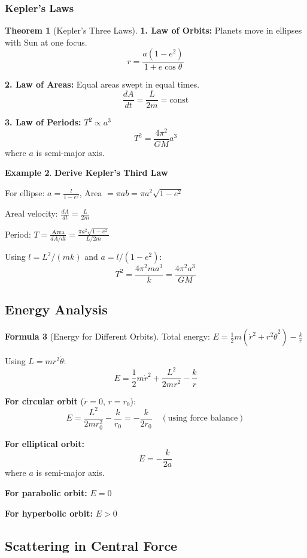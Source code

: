 \documentclass[12pt,a4paper]{article}
\theoremstyle{definition}
\newtheorem{theorem}{Theorem}[section]
\newtheorem{example}[theorem]{Example}
\newtheorem{formula}[theorem]{Formula}
\begin{document}
\subsubsection{Kepler's Laws}

\begin{theorem}[Kepler's Three Laws]
\textbf{1. Law of Orbits:} Planets move in ellipses with Sun at one focus.
\[
r = \frac{a(1-e^2)}{1 + e\cos\theta}
\]

\textbf{2. Law of Areas:} Equal areas swept in equal times.
\[
\frac{dA}{dt} = \frac{L}{2m} = \text{const}
\]

\textbf{3. Law of Periods:} $T^2 \propto a^3$
\[
T^2 = \frac{4\pi^2}{GM}a^3
\]
where $a$ is semi-major axis.
\end{theorem}

\begin{example}
\textbf{Derive Kepler's Third Law}

For ellipse: $a = \frac{l}{1-e^2}$, Area $= \pi ab = \pi a^2\sqrt{1-e^2}$

Areal velocity: $\frac{dA}{dt} = \frac{L}{2m}$

Period: $T = \frac{\text{Area}}{dA/dt} = \frac{\pi a^2\sqrt{1-e^2}}{L/2m}$

Using $l = L^2/(mk)$ and $a = l/(1-e^2)$:
\[
T^2 = \frac{4\pi^2 m a^3}{k} = \frac{4\pi^2 a^3}{GM}
\]
\end{example}

\subsection{Energy Analysis}

\begin{formula}[Energy for Different Orbits]
Total energy: $E = \frac{1}{2}m(\dot{r}^2 + r^2\dot{\theta}^2) - \frac{k}{r}$

Using $L = mr^2\dot{\theta}$:
\[
E = \frac{1}{2}m\dot{r}^2 + \frac{L^2}{2mr^2} - \frac{k}{r}
\]

\textbf{For circular orbit} ($\dot{r} = 0$, $r = r_0$):
\[
E = \frac{L^2}{2mr_0^2} - \frac{k}{r_0} = -\frac{k}{2r_0} \quad (\text{using force balance})
\]

\textbf{For elliptical orbit:}
\[
E = -\frac{k}{2a}
\]
where $a$ is semi-major axis.

\textbf{For parabolic orbit:} $E = 0$

\textbf{For hyperbolic orbit:} $E > 0$
\end{formula}

\subsection{Scattering in Central Force}
\end{document}
